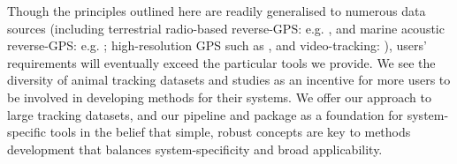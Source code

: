 \begin{refsection}
    Though the principles outlined here are readily generalised to numerous data sources (including terrestrial radio-based reverse-GPS: e.g. \citealt{toledo2020}, and marine acoustic reverse-GPS: e.g. \citealt{aspillaga2021}; high-resolution GPS such as \citealt{strandburg-peshkin2015}, and video-tracking: \citealt{rathore2020}), users' requirements will eventually exceed the particular tools we provide.
    We see the diversity of animal tracking datasets and studies as an incentive for more users to be involved in developing methods for their systems.
    We offer our approach to large tracking datasets, and our pipeline and package as a foundation for system-specific tools in the belief that simple, robust concepts are key to methods development that balances system-specificity and broad applicability.


    \printbibliography[heading=subbibliography]
\end{refsection}
